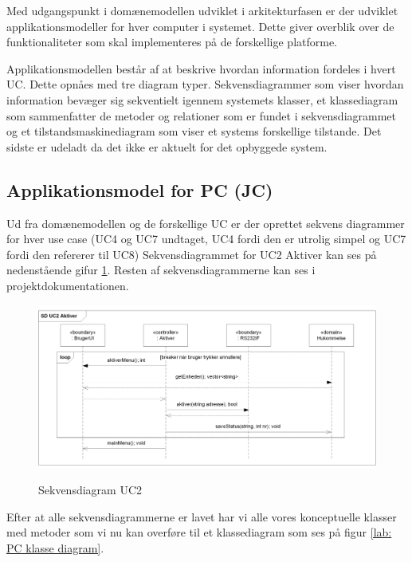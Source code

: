 Med udgangspunkt i domænemodellen udviklet i arkitekturfasen er der udviklet applikationsmodeller for hver computer i systemet. Dette giver overblik over de funktionaliteter som skal implementeres på de forskellige platforme.

Applikationsmodellen består af at beskrive hvordan information fordeles i hvert UC. Dette opnåes med tre diagram typer. Sekvensdiagrammer som viser hvordan information bevæger sig sekventielt igennem systemets klasser, et klassediagram som sammenfatter de metoder og relationer som er fundet i sekvensdiagrammet og et tilstandsmaskinediagram som viser et systems forskellige tilstande. Det sidste er udeladt da det ikke er aktuelt for det opbyggede system.

%
%
\subsection{Applikationsmodel for PC (JC)}

Ud fra domænemodellen og de forskellige UC er der oprettet sekvens diagrammer for hver use case (UC4 og UC7 undtaget, UC4 fordi den er utrolig simpel og UC7 fordi den refererer til UC8) Sekvensdiagrammet for UC2 Aktiver kan ses på nedenstående gifur \ref{lab:Sekvensdiagram UC2}. Resten af sekvensdiagrammerne kan ses i projektdokumentationen.

\begin{figure}[htbp] \centering
{\includegraphics[width=\textwidth]{billeder/uml/PC_UC2}}
\caption{Sekvensdiagram UC2}
\label{lab:Sekvensdiagram UC2}
\end{figure}

Efter at alle sekvensdiagrammerne er lavet har vi alle vores konceptuelle klasser med metoder som vi nu kan overføre til et klassediagram som ses på figur \ref{lab: PC klasse diagram}.

